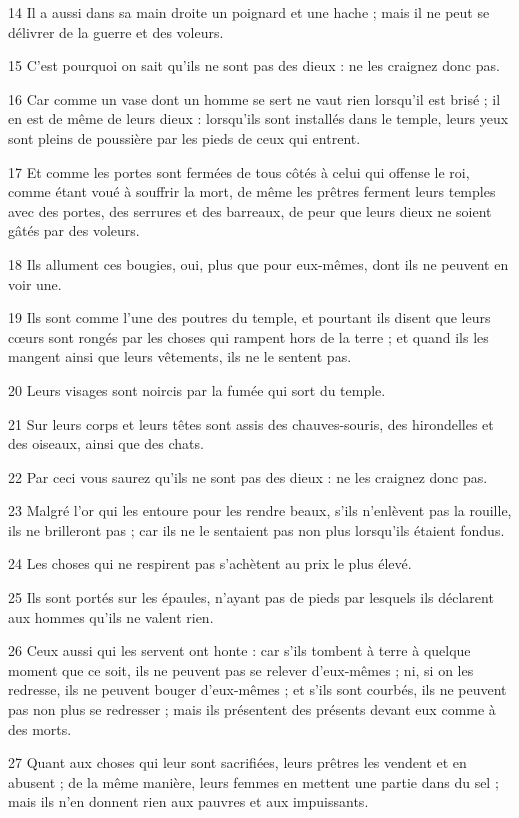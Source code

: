 \par 14 Il a aussi dans sa main droite un poignard et une hache ; mais il ne peut se délivrer de la guerre et des voleurs.
\par 15 C'est pourquoi on sait qu'ils ne sont pas des dieux : ne les craignez donc pas.
\par 16 Car comme un vase dont un homme se sert ne vaut rien lorsqu'il est brisé ; il en est de même de leurs dieux : lorsqu'ils sont installés dans le temple, leurs yeux sont pleins de poussière par les pieds de ceux qui entrent.
\par 17 Et comme les portes sont fermées de tous côtés à celui qui offense le roi, comme étant voué à souffrir la mort, de même les prêtres ferment leurs temples avec des portes, des serrures et des barreaux, de peur que leurs dieux ne soient gâtés par des voleurs.
\par 18 Ils allument ces bougies, oui, plus que pour eux-mêmes, dont ils ne peuvent en voir une.
\par 19 Ils sont comme l'une des poutres du temple, et pourtant ils disent que leurs cœurs sont rongés par les choses qui rampent hors de la terre ; et quand ils les mangent ainsi que leurs vêtements, ils ne le sentent pas.
\par 20 Leurs visages sont noircis par la fumée qui sort du temple.
\par 21 Sur leurs corps et leurs têtes sont assis des chauves-souris, des hirondelles et des oiseaux, ainsi que des chats.
\par 22 Par ceci vous saurez qu'ils ne sont pas des dieux : ne les craignez donc pas.
\par 23 Malgré l'or qui les entoure pour les rendre beaux, s'ils n'enlèvent pas la rouille, ils ne brilleront pas ; car ils ne le sentaient pas non plus lorsqu'ils étaient fondus.
\par 24 Les choses qui ne respirent pas s'achètent au prix le plus élevé.
\par 25 Ils sont portés sur les épaules, n'ayant pas de pieds par lesquels ils déclarent aux hommes qu'ils ne valent rien.
\par 26 Ceux aussi qui les servent ont honte : car s'ils tombent à terre à quelque moment que ce soit, ils ne peuvent pas se relever d'eux-mêmes ; ni, si on les redresse, ils ne peuvent bouger d'eux-mêmes ; et s’ils sont courbés, ils ne peuvent pas non plus se redresser ; mais ils présentent des présents devant eux comme à des morts.
\par 27 Quant aux choses qui leur sont sacrifiées, leurs prêtres les vendent et en abusent ; de la même manière, leurs femmes en mettent une partie dans du sel ; mais ils n'en donnent rien aux pauvres et aux impuissants.
